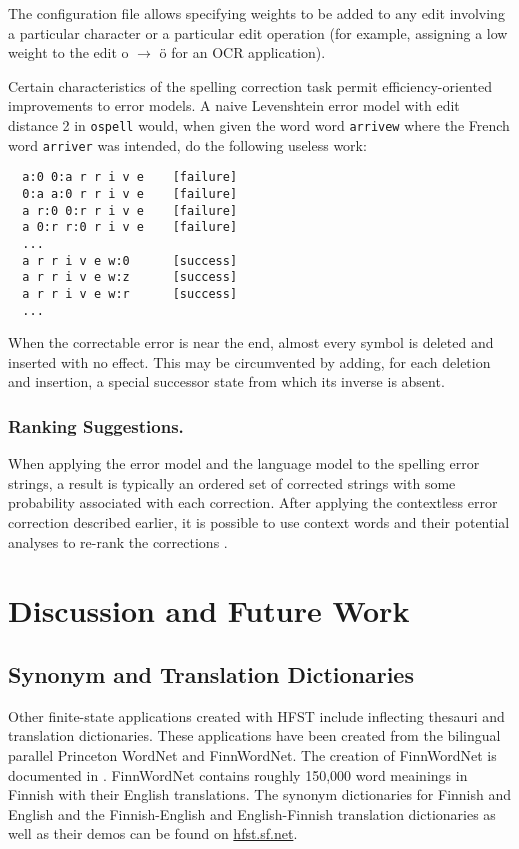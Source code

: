 \documentclass{llncs}
\begin{document}
The configuration file allows specifying weights to be added to any edit
involving a particular character or a particular edit operation (for example,
assigning a low weight to the edit o $\rightarrow$ ö for an OCR application).

Certain characteristics of the spelling correction task permit
efficiency-oriented improvements to error models. A naive Levenshtein error
model with edit distance 2 in \verb!ospell! would, when given the word
word \verb!arrivew! where the French word \verb!arriver! was intended,
do the following useless work:

\begin{verbatim}
  a:0 0:a r r i v e    [failure]
  0:a a:0 r r i v e    [failure]
  a r:0 0:r r i v e    [failure]
  a 0:r r:0 r i v e    [failure]
  ...
  a r r i v e w:0      [success]
  a r r i v e w:z      [success]
  a r r i v e w:r      [success]
  ...
\end{verbatim}

When the correctable error is near the end, almost every symbol is deleted and
inserted with no effect. This may be circumvented by adding, for each deletion
and insertion, a special successor state from which its inverse is absent.

\subsubsection{Ranking Suggestions.}

When applying the error model and the language model to the spelling error strings,
a result is typically an ordered set of corrected strings with some probability
associated with each correction. After applying the contextless error correction
described earlier, it is possible to use context words and their potential
analyses to re-rank the corrections \cite{pirinen/2012/cicling}.


\section{Discussion and Future Work}\label{Discussion}

\subsection{Synonym and Translation Dictionaries}

Other finite-state applications created with HFST include inflecting thesauri and translation dictionaries.
These applications have been created from the bilingual parallel Princeton WordNet and FinnWordNet. 
The creation of FinnWordNet is documented in \cite{linden/2010}. FinnWordNet contains roughly 150,000 
word meainings in Finnish with their English translations. The synonym dictionaries for Finnish and English and the Finnish-English and English-Finnish translation dictionaries as well as their demos can be found on \url{hfst.sf.net}.
\end{document}
